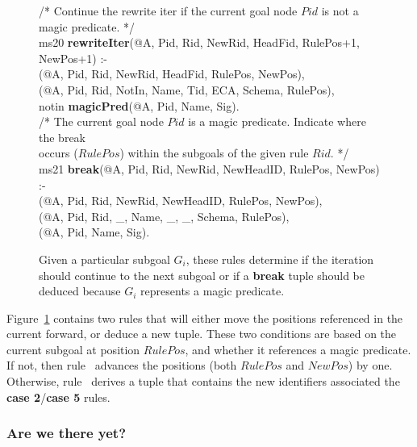 \begin{figure}[!t]
\ssp
\centering
\begin{boxedminipage}{\linewidth}
/* Continue the rewrite iter if the current goal node $Pid$ is not a magic predicate. */ \\
ms20 {\bf rewriteIter}(@A, Pid, Rid, NewRid, HeadFid, RulePos+1, NewPos+1) :- \\
(@A, Pid, Rid, NewRid, HeadFid, RulePos, NewPos), \\
(@A, Pid, Rid, NotIn, Name, Tid, ECA, Schema, RulePos), \\
\datalogspace notin {\bf magicPred}(@A, Pid, Name, Sig). \\

/* The current goal node $Pid$ is a magic predicate. Indicate where the break \\
occurs ($RulePos$) within the subgoals of the given rule $Rid$. */ \\
ms21 {\bf break}(@A, Pid, Rid, NewRid, NewHeadID, RulePos, NewPos) :- \\
(@A, Pid, Rid, NewRid, NewHeadID, RulePos, NewPos), \\
(@A, Pid, Rid, \_, Name, \_, \_, Schema, RulePos), \\
(@A, Pid, Name, Sig).

\end{boxedminipage}
\caption{\label{ch:magic:fig:rewrite4} Given a particular subgoal $G_i$, these rules determine
if the iteration should continue to the next subgoal or if a {\bf break} tuple should be
deduced because $G_i$ represents a magic predicate. }
\end{figure}

Figure~\ref{ch:magic:fig:rewrite4} contains two rules that will either move the
positions referenced in the current  forward, or deduce a new
 tuple.  These two conditions are based on the current subgoal at
position $RulePos$, and whether it references a magic predicate.  If not, then
rule~ advances the  positions (both $RulePos$ and
$NewPos$) by one.  Otherwise, rule~ derives a  tuple that
contains the new identifiers associated the {\bf case 2}/{\bf case 5} rules.

\subsubsection{Are we there yet?}

